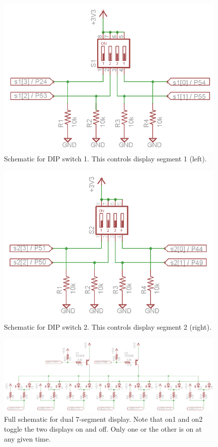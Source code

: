 \documentclass[11pt]{article}
\begin{document}
\begin{figure}[h!]
\centering
\includegraphics[scale=0.54]{s1.png}
\caption{Schematic for DIP switch 1. This controls display segment 1 (left).}
\label{fig:s1_sch}
\end{figure} 


\begin{figure}[h!]
\centering
\includegraphics[scale=0.54]{s2.png}
\caption{Schematic for DIP switch 2. This controls display segment 2 (right).}
\label{fig:s2_sch}
\end{figure} 


\begin{figure}[h!]
\centering
\includegraphics[scale=0.7, angle=90]{seven_segment_all.png}
\caption{Full schematic for dual 7-segment display. Note that on1 and on2 toggle the two displays on and off. Only one or the other is on at any given time.}
\label{fig:seven_seg_sch}
\end{figure} 
\end{document}

